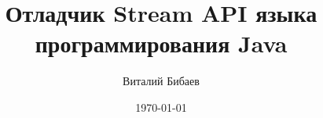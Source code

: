 \documentclass{beamer}
\title[Stream Debugger]{Отладчик Stream API языка программирования Java} %
\author{Виталий Бибаев} %
\institute[СПБАУ] %
{
Санкт-Петербургский академический университет \\ %
\medskip
\textit{vitaliy.bibaev@gmail.com} %
}
\date{\today} %
\begin{document}
\begin{frame}
\titlepage %
\end{frame}




%
\end{document}
